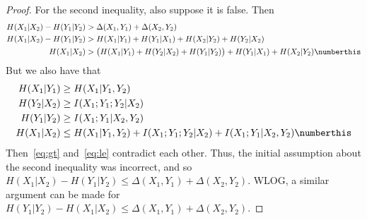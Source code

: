 \documentclass[
  coursecode={MTHE 474},
  assignmentname={Homework \homeworknumber},
  studentnumber=20053722,
  name={Bryan Hoang}
]{
  ltxanswer%
}
\begin{document}
\begin{questions}
\begin{solution}
\begin{parts}
\begin{proof}
          For the second inequality, also suppose it is false. Then
          \begin{align*}
            H(X_{1}|X_{2}) - H(Y_{1}|Y_{2}) &> \Delta(X_{1},Y_{1}) + \Delta(X_{2},Y_{2})                                                                            \\
            H(X_{1}|X_{2}) - H(Y_{1}|Y_{2}) &> H(X_{1}|Y_{1}) + H(Y_{1}|X_{1}) + H(X_{2}|Y_{2}) + H(Y_{2}|X_{2})                                                    \\
            H(X_{1}|X_{2})                  &> \big(H(X_{1}|Y_{1}) + H(Y_{2}|X_{2}) + H(Y_{1}|Y_{2})\big) + H(Y_{1}|X_{1}) + H(X_{2}|Y_{2})\numberthis\label{eq:gt}
          \end{align*}
          But we also have that
          \begin{align*}
            H(X_{1}|Y_{1}) &\ge H(X_{1}|Y_{1},Y_{2})                                                                                   \\
            H(Y_{2}|X_{2}) &\ge I(X_{1};Y_{1};Y_{2}|X_{2})                                                                             \\
            H(Y_{1}|Y_{2}) &\ge I(X_{1};Y_{1}|X_{2},Y_{2})                                                                             \\
            H(X_{1}|X_{2}) &\le H(X_{1}|Y_{1},Y_{2}) + I(X_{1};Y_{1};Y_{2}|X_{2}) + I(X_{1};Y_{1}|X_{2},Y_{2})\numberthis\label{eq:le}
          \end{align*}
          Then~\eqref{eq:gt} and~\eqref{eq:le} contradict each other. Thus, the initial assumption about the second inequality was incorrect, and so \(H(X_{1}|X_{2}) - H(Y_{1}|Y_{2}) \le \Delta(X_{1},Y_{1}) + \Delta(X_{2},Y_{2})\). WLOG, a similar argument can be made for \(H(Y_{1}|Y_{2}) - H(X_{1}|X_{2}) \le \Delta(X_{1},Y_{1}) + \Delta(X_{2},Y_{2})\).
        \end{proof}
      \end{parts}
    \end{solution}
  \end{questions}
\end{document}
